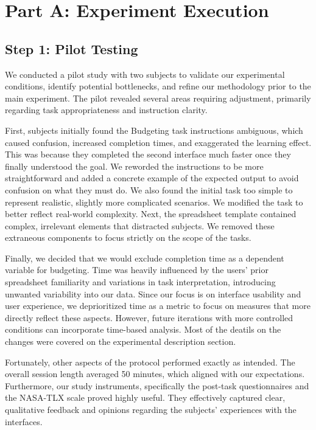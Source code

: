 \documentclass[12pt,a4paper]{article}
\begin{document}

\newpage
{}   
\tableofcontents
\newpage
{} 



\section{Part A: Experiment Execution}

\subsection{Step 1: Pilot Testing} 
\par
\indent
We conducted a pilot study with two subjects to validate our experimental conditions, identify potential bottlenecks, and refine our methodology prior to the main experiment. The pilot revealed several areas requiring adjustment, primarily regarding task appropriateness and instruction clarity.

First, subjects initially found the Budgeting task instructions ambiguous, which caused confusion, increased completion times, and exaggerated the learning effect. This was because they completed the second interface much faster once they finally understood the goal. We reworded the instructions to be more straightforward and added a concrete example of the expected output to avoid confusion on what they must do. We also found the initial task too simple to represent realistic, slightly more complicated scenarios. We modified the task to better reflect real-world complexity. Next, the spreadsheet template contained complex, irrelevant elements that distracted subjects. We removed these extraneous components to focus strictly on the scope of the tasks. 

Finally, we decided that we would exclude completion time as a dependent variable for budgeting. Time was heavily influenced by the users' prior spreadsheet familiarity and variations in task interpretation, introducing unwanted variability into our data. Since our focus is on interface usability and user experience, we deprioritized time as a metric to focus on measures that more directly reflect these aspects. However, future iterations with more controlled conditions can incorporate time-based analysis. Most of the deatils on the changes were covered on the experimental description section.

Fortunately, other aspects of the protocol performed exactly as intended. The overall session length averaged 50 minutes, which aligned with our expectations. Furthermore, our study instruments, specifically the post-task questionnaires and the NASA-TLX scale proved highly useful. They effectively captured clear, qualitative feedback and opinions regarding the subjects' experiences with the interfaces.
\newline
\end{document}
